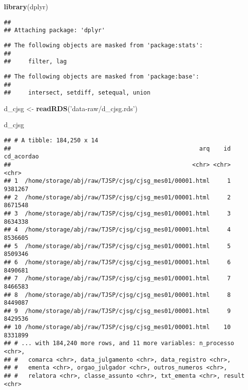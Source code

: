 \documentclass[]{book}
\newenvironment{Shaded}{\begin{snugshade}}{\end{snugshade}}
\newcommand{\KeywordTok}[1]{\textcolor[rgb]{0.13,0.29,0.53}{\textbf{{#1}}}}
\newcommand{\StringTok}[1]{\textcolor[rgb]{0.31,0.60,0.02}{{#1}}}
\newcommand{\NormalTok}[1]{{#1}}
\begin{document}
\begin{Shaded}
\begin{Highlighting}[]
\KeywordTok{library}\NormalTok{(dplyr)}
\end{Highlighting}
\end{Shaded}

\begin{verbatim}
## 
## Attaching package: 'dplyr'
\end{verbatim}

\begin{verbatim}
## The following objects are masked from 'package:stats':
## 
##     filter, lag
\end{verbatim}

\begin{verbatim}
## The following objects are masked from 'package:base':
## 
##     intersect, setdiff, setequal, union
\end{verbatim}

\begin{Shaded}
\begin{Highlighting}[]
\NormalTok{d_cjsg <-}\StringTok{ }\KeywordTok{readRDS}\NormalTok{(}\StringTok{'data-raw/d_cjsg.rds'}\NormalTok{)}

\NormalTok{d_cjsg}
\end{Highlighting}
\end{Shaded}

\begin{verbatim}
## # A tibble: 184,250 x 14
##                                                      arq    id cd_acordao
##                                                    <chr> <chr>      <chr>
## 1  /home/storage/abj/raw/TJSP/cjsg/cjsg_mes01/00001.html     1    9381267
## 2  /home/storage/abj/raw/TJSP/cjsg/cjsg_mes01/00001.html     2    8671548
## 3  /home/storage/abj/raw/TJSP/cjsg/cjsg_mes01/00001.html     3    8634338
## 4  /home/storage/abj/raw/TJSP/cjsg/cjsg_mes01/00001.html     4    8536605
## 5  /home/storage/abj/raw/TJSP/cjsg/cjsg_mes01/00001.html     5    8509346
## 6  /home/storage/abj/raw/TJSP/cjsg/cjsg_mes01/00001.html     6    8490681
## 7  /home/storage/abj/raw/TJSP/cjsg/cjsg_mes01/00001.html     7    8466583
## 8  /home/storage/abj/raw/TJSP/cjsg/cjsg_mes01/00001.html     8    8449087
## 9  /home/storage/abj/raw/TJSP/cjsg/cjsg_mes01/00001.html     9    8429536
## 10 /home/storage/abj/raw/TJSP/cjsg/cjsg_mes01/00001.html    10    8331899
## # ... with 184,240 more rows, and 11 more variables: n_processo <chr>,
## #   comarca <chr>, data_julgamento <chr>, data_registro <chr>,
## #   ementa <chr>, orgao_julgador <chr>, outros_numeros <chr>,
## #   relatora <chr>, classe_assunto <chr>, txt_ementa <chr>, result <chr>
\end{verbatim}
\end{document}
